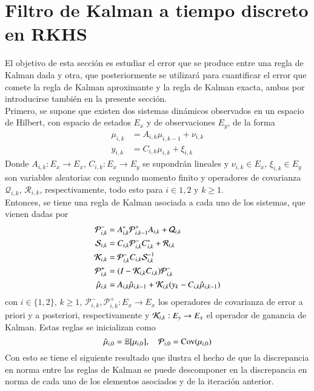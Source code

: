 \section{Filtro de Kalman a tiempo discreto en RKHS}

El objetivo de esta sección es estudiar el error que se produce entre una regla de Kalman dada y otra, que posteriormente se utilizará para cuantificar el error que comete la regla de Kalman aproximante y la regla de Kalman exacta, ambas por introducirse también en la presente sección. \\
Primero, se supone que existen dos sistemas dinámicos observados en un espacio de Hilbert, con espacio de estados $E_x$ y de observaciones $E_y$, de la forma
\begin{equation*}
	\begin{aligned}
		\mu_{i,k}  &= A_{i,k} \mu_{i,k-1} + \nu_{i,k} \\
		y_{i,k} &= C_{i,k} \mu_{i,k} + \xi_{i, k}
	\end{aligned}
\end{equation*}
Donde $A_{i,k} : E_x \to E_x$, $C_{i,k}: E_x \to E_y$ se supondrán lineales y $\nu_{i,k} \in E_x$, $\xi_{i,k} \in E_y$ son variables aleatorias con segundo momento finito y operadores de covarianza $\mathcal{Q}_{i,k}$, $\mathcal{R}_{i,k}$, respectivamente, todo esto para $i \in {1,2}$ y $k \geq 1$. \\
Entonces, se tiene una regla de Kalman asociada a cada uno de los sistemas, que vienen dadas por
\begin{equation*}
	\begin{aligned}
		\mathcal{P}_{i,k}^- &= A_{i,k}^* \mathcal{P}_{i,k-1}^+ A_{i,k} + \mathcal{Q}_{i,k} \\
		\mathcal{S}_{i,k} &= C_{i,k} \mathcal{P}_{i,k}^- C_{i,k}^* + \mathcal{R}_{i,k} \\
		\mathcal{K}_{i,k} &= \mathcal{P}_{i,k}^- C_{i,k}\mathcal{S}_{i,k}^{-1} \\
		\mathcal{P}_{i,k}^+  &= (I - \mathcal{K}_{i,k} C_{i,k}) \mathcal{P}_{i,k}^- \\
		\hat{\mu}_{i,k} &= A_{i,k} \hat \mu_{i,k-1} + \mathcal{K}_{i,k} (y_{k} - C_{i,k} \hat\mu_{i,k-1}) 
	\end{aligned}
\end{equation*}
con $i \in \{ 1,2 \}$, $k \geq 1$, $\mathcal{P}_{i,k}^-, \mathcal{P}_{i,k}^+ : E_x \to E_x$ los operadores de covarianza de error a priori y a posteriori, respectivamente y $\mathcal{K}_{i,k} : E_y \to E_x$ el operador de ganancia de Kalman. Estas reglas se inicializan como
\begin{equation*}
	\hat{\mu}_{i,0} = \mathbb{E} [\mu_{i,0}], \quad \mathcal{P}_{i,0} = \text{Cov} ( \mu_{i,0})
\end{equation*}
Con esto se tiene el siguiente resultado que ilustra el hecho de que la discrepancia en norma entre las reglas de Kalman se puede descomponer en la discrepancia en norma de cada uno de los elementos asociados y de la iteración anterior.

